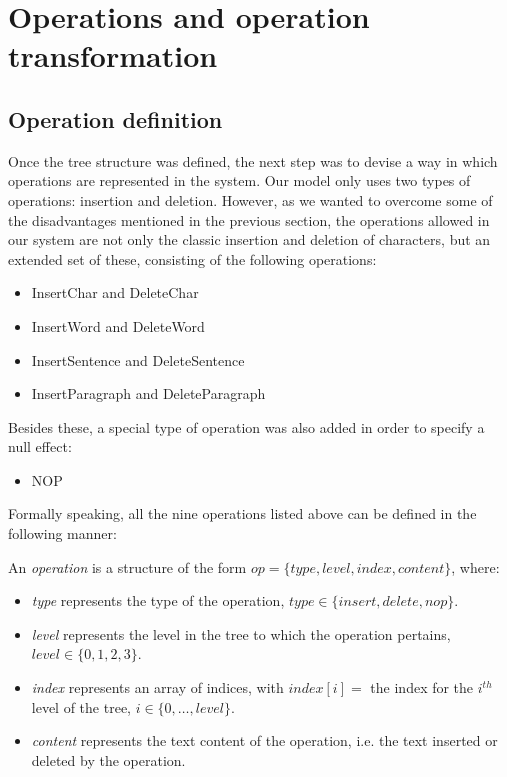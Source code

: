 \section{Operations and operation transformation}

\subsection{Operation definition}
\label{sec:opdef}

Once the tree structure was defined, the next step was to devise a way in which operations
are represented in the system. Our model only uses two types of operations: insertion and
deletion. However, as we wanted to overcome some of the disadvantages mentioned in the previous
section, the operations allowed in our system are not only the classic insertion and deletion
of characters, but an extended set of these, consisting of the following operations:

\begin{itemize}

\item InsertChar and DeleteChar
\item InsertWord and DeleteWord
\item InsertSentence and DeleteSentence
\item InsertParagraph and DeleteParagraph

\end{itemize}

Besides these, a special type of operation was also added in order to specify a null effect:

\begin{itemize}

\item NOP

\end{itemize}

Formally speaking, all the nine operations listed above can be defined in the following
manner:

\begin{defi}

An \emph{operation} is a structure of the form $op=\{type,level,index,content\}$, where:

\begin{itemize}

\item \emph{type} represents the type of the operation, $type \in \{insert,delete,nop\}$.

\item \emph{level} represents the level in the tree to which the operation pertains,
      $level \in \{0,1,2,3\}$.

\item \emph{index} represents an array of indices, with $index[i]=$ the index for the
      $i^{th}$ level of the tree, $i \in \{0,\dots,level\}$.

\item \emph{content} represents the text content of the operation, i.e. the text inserted
      or deleted by the operation.

\end{itemize}
\end{defi}

